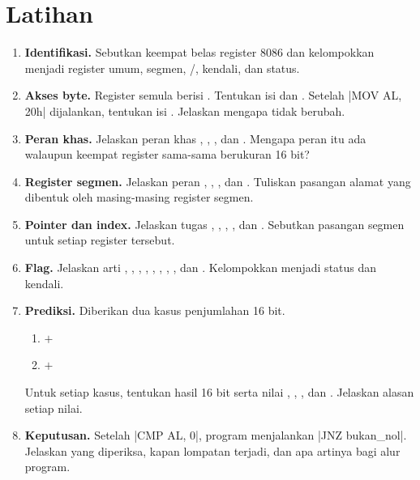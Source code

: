 \section{Latihan}
\label{sec:latihan-bab5}

\begin{enumerate}
    \item \textbf{Identifikasi.} Sebutkan keempat belas register
          8086 dan kelompokkan menjadi register umum, segmen,
          /, kendali, dan status.

    \item \textbf{Akses byte.} Register  semula berisi
          . Tentukan isi  dan . Setelah
          \lstasm|MOV AL, 20h| dijalankan, tentukan isi .
          Jelaskan mengapa  tidak berubah.

    \item \textbf{Peran khas.} Jelaskan peran khas ,
          , , dan . Mengapa peran itu ada
          walaupun keempat register sama-sama berukuran 16 bit?

    \item \textbf{Register segmen.} Jelaskan peran ,
          , , dan . Tuliskan pasangan alamat
          yang dibentuk oleh masing-masing register segmen.

    \item \textbf{Pointer dan index.} Jelaskan tugas ,
          , , , dan . Sebutkan
          pasangan segmen untuk setiap register tersebut.

    \item \textbf{Flag.} Jelaskan arti , ,
          , , , , ,
          , dan . Kelompokkan menjadi 
          status dan  kendali.

    \item \textbf{Prediksi.} Diberikan dua kasus penjumlahan 16 bit.
          \begin{enumerate}
              \item {} $+$ 
              \item {} $+$ 
          \end{enumerate}
          Untuk setiap kasus, tentukan hasil 16 bit serta nilai
          , , , dan . Jelaskan
          alasan setiap nilai.

    \item \textbf{Keputusan.} Setelah \lstasm|CMP AL, 0|, program
          menjalankan \lstasm|JNZ bukan_nol|. Jelaskan 
          yang diperiksa, kapan lompatan terjadi, dan apa artinya
          bagi alur program.
\end{enumerate}

